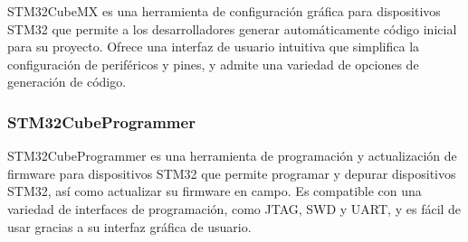 STM32CubeMX \citep{stm32-cubemx} es una herramienta de configuración gráfica para dispositivos STM32 que permite a los desarrolladores generar automáticamente código inicial para su proyecto. Ofrece una interfaz de usuario intuitiva que simplifica la configuración de periféricos y pines, y admite una variedad de opciones de generación de código. 


\subsubsection{STM32CubeProgrammer}

STM32CubeProgrammer \citep{stm32-cubeprogrammer} es una herramienta de programación y actualización de firmware para dispositivos STM32 que permite programar y depurar dispositivos STM32, así como actualizar su firmware en campo. Es compatible con una variedad de interfaces de programación, como JTAG, SWD y UART, y es fácil de usar gracias a su interfaz gráfica de usuario. 



